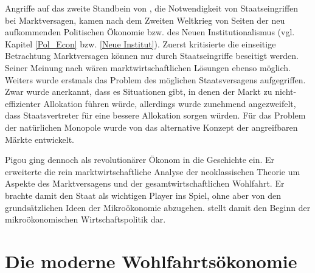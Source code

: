 Angriffe auf das zweite Standbein von \textcite{Pigou1920}, die Notwendigkeit von Staatseingriffen bei Marktversagen, kamen nach dem Zweiten Weltkrieg von Seiten der neu aufkommenden Politischen Ökonomie bzw. des Neuen Institutionalismus (vgl. Kapitel \ref{Pol_Econ} bzw. \ref{Neue Institut}). Zuerst kritisierte \textcite{Coase1960} die einseitige Betrachtung Marktversagen können nur durch Staatseingriffe beseitigt werden. Seiner Meinung nach wären marktwirtschaftlichen Lösungen ebenso möglich. Weiters wurde erstmals das Problem des möglichen Staatsversagens aufgegriffen. Zwar wurde anerkannt, dass es Situationen gibt, in denen der Markt zu nicht-effizienter Allokation führen würde, allerdings wurde zunehmend angezweifelt, dass Staatsvertreter für eine bessere Allokation sorgen würden. Für das Problem der natürlichen Monopole wurde von \textcite{Baumol1982} das alternative Konzept der angreifbaren Märkte entwickelt.

Pigou ging dennoch als revolutionärer Ökonom in die Geschichte ein. Er erweiterte die rein marktwirtschaftliche Analyse der neoklassischen Theorie um Aspekte des Marktversagens und der gesamtwirtschaftlichen Wohlfahrt. Er brachte damit den Staat als wichtigen Player ins Spiel, ohne aber von den grundsätzlichen Ideen der Mikroökonomie abzugehen. \textcite{Pigou1920} stellt damit den Beginn der mikroökonomischen Wirtschaftspolitik dar.


\section{Die moderne Wohlfahrtsökonomie}
\label{Wohlfahrt}

